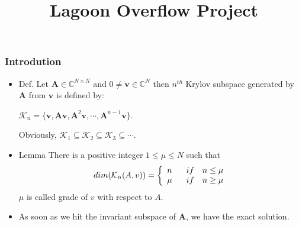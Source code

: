 \documentclass[mathserif]{beamer}
\title{ Lagoon Overflow Project}
\author{}
\date{}
\begin{document}
\maketitle

\begin{frame}
 \frametitle{Introdution}
{\vspace*{.010mm}}

\begin{itemize}[<+->]
\item Def. Let $\mathbf{A} \in \mathbb{C}^{N \times N}$ and $0 \ne \mathbf{v} \in \mathbb{C}^N$ then $n^{th}$ Krylov subspace generated by $\mathbf{A}$ from $\mathbf{v}$ is defined by:\\

\begin{center}$\mathcal{K}_n=\{\mathbf{v}, \mathbf{A}\mathbf{v}, \mathbf{A}^2\mathbf{v}, \cdots, \mathbf{A}^{n-1}\mathbf{v} \}$.\end{center}

Obviously, $\mathcal{K}_1 \subseteq \mathcal{K}_2 \subseteq \mathcal{K}_3 \subseteq \cdots .$

\item  \begin{block}{Lemma}
There is a positive integer $1 \le \mu \le N$ such that 
\[ dim (\mathcal{K}_n(A,v)) = \left\{ \begin{array}{lll}
       n     \hspace{.1in} & if & n \le \mu\\
       \mu \hspace{.1in} & if & n \ge \mu\\
\end{array}  \right. \] 
$\mu$ is called grade of $v$ with respect to $A$.
\end{block}

\item As soon as we hit the invariant subspace of $\mathbf{A}$, we have the exact solution.
\end{itemize}
\end{frame}
\end{document}
